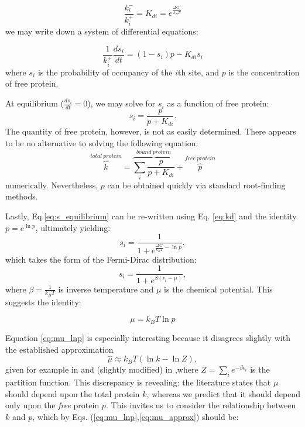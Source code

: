 \documentclass{article}
\begin{document}
\begin{equation}\label{eq:kd}
  \frac{k^-_i}{k^+_i} = K_{di} = e^{\frac{\Delta G_i}{k_BT}}
\end{equation}
we may write down a system of differential equations:

\begin{equation}
  \label{eq:s_diff}
  \frac{1}{k_i^+}\frac{ds_i}{dt} = (1-s_i)p - K_{di}s_i
\end{equation}
where $s_i$ is the probability of occupancy of the $i$th site, and $p$
is the concentration of free protein.

At equilibrium ($\frac{ds_i}{dt} = 0$), we may solve for $s_i$ as a
function of free protein:
\begin{equation}
  \label{eq:s_equilibrium}
  s_i = \frac{p}{p + K_{di}}.
\end{equation}
The quantity of free protein, however, is not as easily determined.
There appears to be no alternative to solving the following equation:
\begin{equation}
  \label{eq:p_numeric}
  \overset{total\ protein}{\overbrace{k}} = \overset{bound\ protein}{\overbrace{\displaystyle\sum_i\frac{p}{p + K_{di}}}} + \overset{free\ protein}{\overbrace{p}}
\end{equation}
numerically.  Nevertheless, $p$ can be obtained quickly via standard
root-finding methods.

Lastly, Eq.\ref{eq:s_equilibrium} can be re-written using
Eq. \ref{eq:kd} and the identity $p = e^{\ln p}$, ultimately yielding:
\begin{equation}
  s_i = \frac{1}{1 + e^{\frac{\Delta G}{k_BT}  - \ln p}},
\end{equation}
which takes the form of the Fermi-Dirac distribution:
\begin{equation}
  \label{eq:s_fd}
  s_i = \frac{1}{1 + e^{\beta(\epsilon_i - \mu)}},
\end{equation}
where $\beta = \frac{1}{k_BT}$ is inverse temperature and $\mu$ is the
chemical potential.  This suggests the identity:

\begin{equation}
  \label{eq:mu_lnp}
  \mu = k_BT \ln p
\end{equation}

Equation \ref{eq:mu_lnp} is
especially interesting because it disagrees slightly with the
established approximation
\begin{equation}
  \label{eq:mu_approx}
  \hat{\mu} \approx k_BT (\ln k - \ln Z),
\end{equation}
given for example in \cite{gerland02} and (slightly modified) in
\cite{zhao09},where $Z=\sum_ie^{-\beta\epsilon_i}$ is the partition
function.  This discrepancy is revealing: the literature states that
$\mu$ should depend upon the total protein $k$, whereas we predict
that it should depend only upon the \textit{free} protein $p$.  This
invites us to consider the relationship between $k$ and $p$, which by
Eqs. (\ref{eq:mu_lnp},\ref{eq:mu_approx}) should be:
\end{document}
